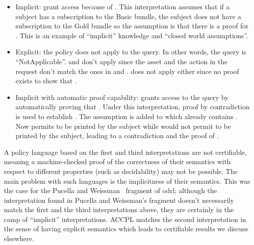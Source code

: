 \begin{itemize}
\item Implicit: grant access because of . This interpretation assumes that if a subject has a subscription to the Basic bundle, the subject does not have a subscription to the Gold bundle so the assumption is that there is a proof for . This is an example of ``implicit'' knowledge and ``closed world assumptions''.

\item Explicit: the policy does not apply to the query. In other words, the query is ``NotApplicable''.  and  don't apply since the asset and the action in the request don't match the ones in  and .  does not apply either since no proof exists to show that . 

\item Implicit with automatic proof capability: grants access to the query by automatically proving that . Under this interpretation, proof by contradiction is used to establish . The assumption  is added to  which already contains . Now  permits  to be printed by the subject while  would not permit  to be printed by the subject, leading to a contradiction and the proof of .
\end{itemize}

A policy language based on the first and third interpretations are not certifiable, meaning a machine-checked proof of the correctness of their semantics with respect to different properties (such as decidability) may not be possible. The main problem with such languages is the implicitness of their semantics. This was the case for the Pucella and Weissman~\cite{pucella2006} fragment of \ac{odrl}; although the interpretation found in Pucella and Weissman's fragment doesn't necessarily match the first and the third interpretations above, they are certainly in the camp of ``implicit'' interpretations. \ac{ACCPL} matches the second interpretation in the sense of having explicit semantics which leads to certifiable results we discuss elsewhere. 





